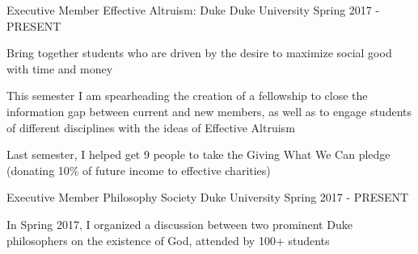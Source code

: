 


\begin{cventries}


\cventry
{Executive Member} %
{Effective Altruism: Duke} %
{Duke University} %
{Spring 2017 - PRESENT} %
{ %
\begin{cvitems}
\item {Bring together students who are driven by the desire to maximize social good with time and money}
\item {This semester I am spearheading the creation of a fellowship to close the information gap between current and new members, as well as to engage students of different disciplines with the ideas of Effective Altruism}
\item {Last semester, I helped get 9 people to take the Giving What We Can pledge (donating 10\% of future income to effective charities)}
\end{cvitems}
}


\cventry
{Executive Member} %
{Philosophy Society} %
{Duke University} %
{Spring 2017 - PRESENT} %
{ %
\begin{cvitems}
\item {In Spring 2017, I organized a discussion between two prominent Duke philosophers on the existence of God, attended by 100+ students}
\end{cvitems}
}




\end{cventries}
